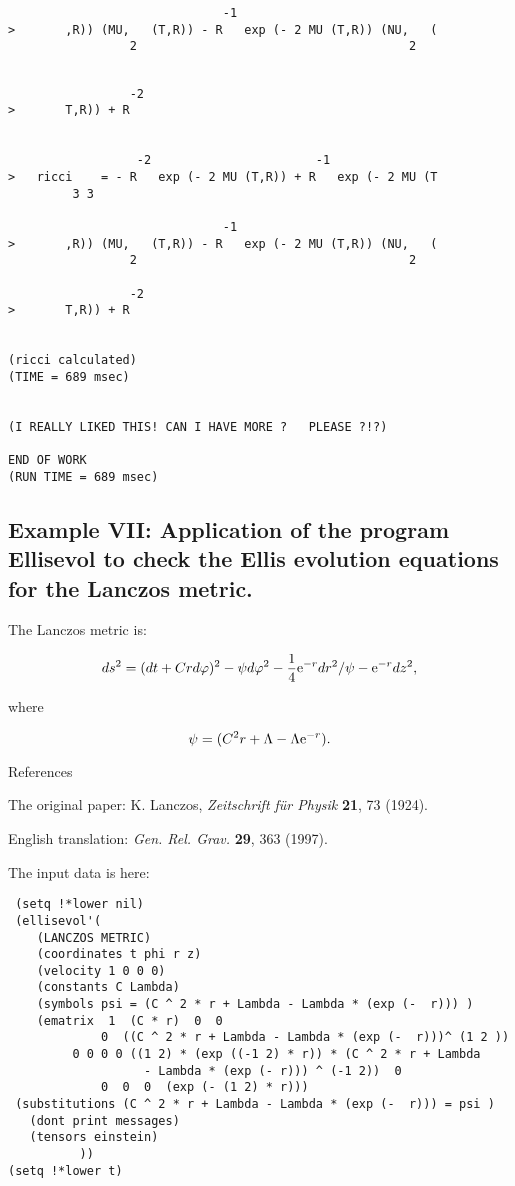 {\samepage
\begin{verbatim}
                              -1
>       ,R)) (MU,   (T,R)) - R   exp (- 2 MU (T,R)) (NU,   (
                 2                                      2
\end{verbatim}
    }
\begin{verbatim}

                 -2
>       T,R)) + R


                  -2                       -1
>   ricci    = - R   exp (- 2 MU (T,R)) + R   exp (- 2 MU (T
         3 3

                              -1
>       ,R)) (MU,   (T,R)) - R   exp (- 2 MU (T,R)) (NU,   (
                 2                                      2

                 -2
>       T,R)) + R


(ricci calculated)
(TIME = 689 msec)


(I REALLY LIKED THIS! CAN I HAVE MORE ?   PLEASE ?!?)

END OF WORK
(RUN TIME = 689 msec)
\end{verbatim}

\subsection{Example VII: Application of the program Ellisevol to check the
Ellis evolution equations for the Lanczos metric.}

The Lanczos metric is:

$$ ds^2 = (dt + Crd\varphi)^2 - \psi d\varphi^2 - {1 \over 4} {\rm e}^{- r}
dr^2/\psi - {\rm e}^{- r}dz^2, $$

\noindent where

$$ \psi = (C^2 r + \Lambda - \Lambda {\rm e}^{- r}).$$

\bigskip

\centerline{References}

The original paper: K. Lanczos, {\it Zeitschrift f\"{u}r Physik} {\bf 21}, 73
(1924).

English translation: {\it Gen. Rel. Grav.} {\bf 29}, 363 (1997).

The input data is here:

\bigskip

\begin{verbatim}
 (setq !*lower nil)
 (ellisevol'(
    (LANCZOS METRIC)
    (coordinates t phi r z)
    (velocity 1 0 0 0)
    (constants C Lambda)
    (symbols psi = (C ^ 2 * r + Lambda - Lambda * (exp (-  r))) )
    (ematrix  1  (C * r)  0  0
             0  ((C ^ 2 * r + Lambda - Lambda * (exp (-  r)))^ (1 2 ))
         0 0 0 0 ((1 2) * (exp ((-1 2) * r)) * (C ^ 2 * r + Lambda
                   - Lambda * (exp (- r))) ^ (-1 2))  0
             0  0  0  (exp (- (1 2) * r)))
 (substitutions (C ^ 2 * r + Lambda - Lambda * (exp (-  r))) = psi )
   (dont print messages)
   (tensors einstein)
          ))
(setq !*lower t)
\end{verbatim}

